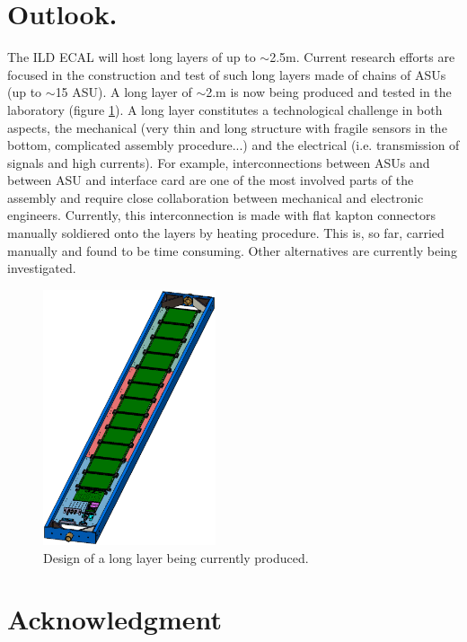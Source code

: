 \documentclass[journal]{IEEEtran}
\begin{document}
\section{Outlook.}

The ILD ECAL will host long layers of up to $\sim$2.5m.
Current research efforts are focused in the construction and test of such long layers made of chains of ASUs (up to $\sim$15 ASU).
A long layer of $\sim$2.m  is now being produced and tested in the laboratory (figure \ref{longslab}).
A long layer constitutes a technological challenge in both aspects, the mechanical
(very thin and long structure with fragile sensors in the bottom, complicated assembly procedure...)
and the electrical (i.e. transmission of signals and high currents).
For example, interconnections between ASUs and between ASU and interface card are one of the most involved parts of the assembly
and require close collaboration between mechanical and electronic engineers.
Currently, this interconnection is made with flat kapton connectors manually soldiered onto the layers by heating procedure.
This is, so far, carried manually and found to be time consuming. Other alternatives are currently being  investigated.


\begin{figure}[!t]
\centering
\includegraphics[width=2.0in]{longslab.eps}
\caption{Design of a long layer being currently produced.}
\label{longslab}
\end{figure}


\appendices
\section*{Acknowledgment}
\end{document}
